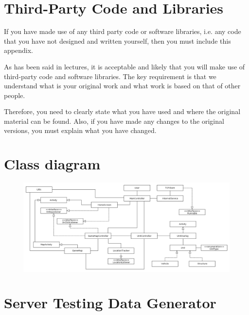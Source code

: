 \chapter{Third-Party Code and Libraries}

If you have made use of any third party code or software libraries, i.e. any code that you have not designed and written yourself, then you must include this appendix. 

As has been said in lectures, it is acceptable and likely that you will make use of third-party code and software libraries. The key requirement is that we understand what is your original work and what work is based on that of other people. 

Therefore, you need to clearly state what you have used and where the original material can be found. Also, if you have made any changes to the original versions, you must explain what you have changed. 


\chapter{Class diagram}\label{ap_class}

\begin{figure}[H]
  \centering
  \includegraphics[height=0.3\textheight, angle=90]{Images/diagrams/class.png}
\end{figure}



\chapter{Server Testing Data Generator}\label{server_testing}


